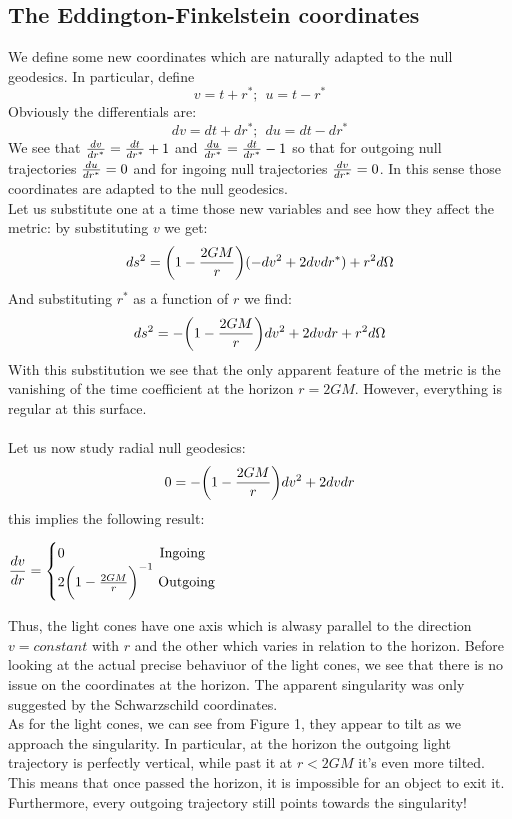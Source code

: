 \documentclass[]{article}
\theoremstyle{definition}
\theoremstyle{Theorem}
\theoremstyle{definition}
\theoremstyle{definition}
\theoremstyle{definition}
\begin{document}
\subsection{The Eddington-Finkelstein coordinates}
We define some new coordinates which are naturally adapted to the null geodesics. In particular, define
$$v=t+r^*;\hspace{5pt} u=t-r^*$$
Obviously the differentials are:
$$dv=dt+dr^*;\hspace{5pt} du=dt-dr^*$$
We see that ${dv\over dr^*}={dt\over dr^*}+1$ and ${du\over dr^*}={dt\over dr^*}-1$ so that for outgoing null trajectories ${du\over dr^*}=0$ and for ingoing null trajectories ${dv\over dr^*}=0$. In this sense those coordinates are adapted to the null geodesics.\\
Let us substitute one at a time those new variables and see how they affect the metric: by substituting $v$ we get:
$$ds^2=\bigg(1-{2GM\over r}\bigg)(-dv^2+2dvdr^*)+r^2d\Omega$$
And substituting $r^*$ as a function of $r$ we find:
$$ds^2=-\bigg(1-{2GM\over r}\bigg)dv^2+2dvdr+r^2d\Omega$$
With this substitution we see that the only apparent feature of the metric is the vanishing of the time coefficient at the horizon $r=2GM$. However, everything is regular at this surface.\\
\\
Let us now study radial null geodesics: 
$$0=-\bigg(1-{2GM\over r}\bigg)dv^2+2dvdr$$
this implies the following result:
\\
\begin{center}
	\begin{math}
		\displaystyle {dv\over dr}=
		\begin{cases}
			0 \mbox{\hspace{68pt}Ingoing}\\
			2\bigg(1-{2GM\over r}\bigg)^{-1} \mbox{  Outgoing}
		\end{cases}
	\end{math}
\end{center}
Thus, the light cones have one axis which is alwasy parallel to the direction $v=constant$ with $r$ and the other which varies in relation to the horizon. Before looking at the actual precise behaviuor of the light cones, we see that there is no issue on the coordinates at the horizon. The apparent singularity was only suggested by the Schwarzschild coordinates.\\
As for the light cones, we can see from Figure 1, they appear to tilt as we approach the singularity. In particular, at the horizon the outgoing light trajectory is perfectly vertical, while past it at $r<2GM$ it's even more tilted. This means that once passed the horizon, it is impossible for an object to exit it. Furthermore, every outgoing trajectory still points towards the singularity!\\
\end{document}
